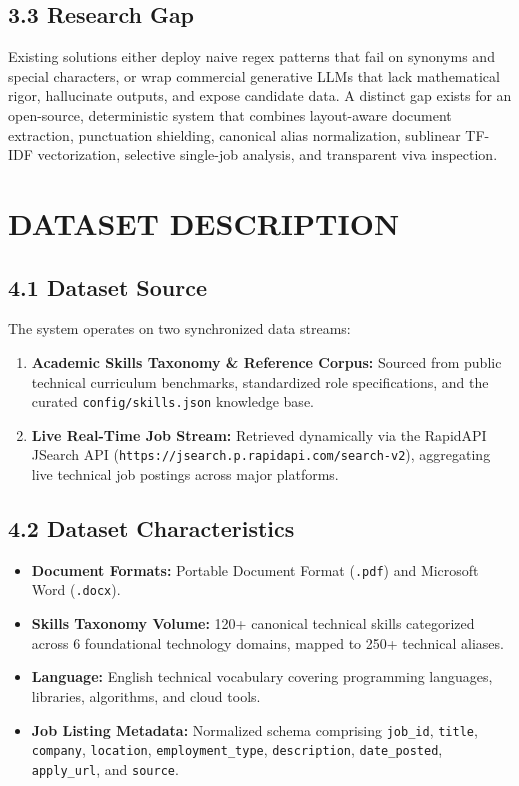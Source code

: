 \documentclass[11pt,a4paper]{article}
\begin{document}
\subsection{3.3 Research Gap}
Existing solutions either deploy naive regex patterns that fail on synonyms and special characters, or wrap commercial generative LLMs that lack mathematical rigor, hallucinate outputs, and expose candidate data. A distinct gap exists for an open-source, deterministic system that combines layout-aware document extraction, punctuation shielding, canonical alias normalization, sublinear TF-IDF vectorization, selective single-job analysis, and transparent viva inspection.

\newpage

\section{DATASET DESCRIPTION}

\subsection{4.1 Dataset Source}
The system operates on two synchronized data streams:
\begin{enumerate}[noitemsep]
    \item \textbf{Academic Skills Taxonomy \& Reference Corpus:} Sourced from public technical curriculum benchmarks, standardized role specifications, and the curated \texttt{config/skills.json} knowledge base.
    \item \textbf{Live Real-Time Job Stream:} Retrieved dynamically via the RapidAPI JSearch API (\texttt{https://jsearch.p.rapidapi.com/search-v2}), aggregating live technical job postings across major platforms.
\end{enumerate}

\subsection{4.2 Dataset Characteristics}
\begin{itemize}[noitemsep]
    \item \textbf{Document Formats:} Portable Document Format (\texttt{.pdf}) and Microsoft Word (\texttt{.docx}).
    \item \textbf{Skills Taxonomy Volume:} 120+ canonical technical skills categorized across 6 foundational technology domains, mapped to 250+ technical aliases.
    \item \textbf{Language:} English technical vocabulary covering programming languages, libraries, algorithms, and cloud tools.
    \item \textbf{Job Listing Metadata:} Normalized schema comprising \texttt{job\_id}, \texttt{title}, \texttt{company}, \texttt{location}, \texttt{employment\_type}, \texttt{description}, \texttt{date\_posted}, \texttt{apply\_url}, and \texttt{source}.
\end{itemize}
\end{document}
